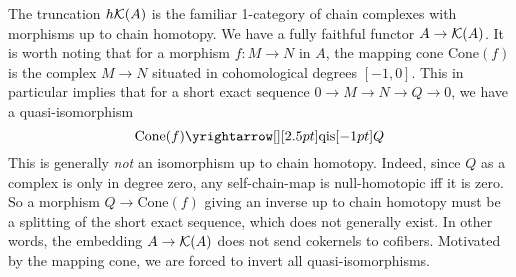 \documentclass{article}
\begin{document}
The truncation $h\mathcal{K}(A)$ is the familiar
1-category of chain complexes with morphisms up to chain homotopy.
We have a fully faithful functor $A \to \mathcal{K}(A)$.
It is worth noting that for a morphism $f : M \to N$ in $A$,
the mapping cone $\mathrm{Cone}(f)$ is the complex $M \to N$
situated in cohomological degrees $[-1, 0]$.
This in particular implies that for a short exact sequence
$0 \to M \to N \to Q \to 0$,
we have a quasi-isomorphism \[
  \mathrm{Cone}(f) \map{\text{qis}}{} Q
\] 
This is generally \emph{not} an isomorphism up to chain homotopy.
Indeed, since $Q$ as a complex is only in degree zero,
any self-chain-map is null-homotopic iff it is zero.
So a morphism $Q \to \mathrm{Cone}(f)$ giving an inverse
up to chain homotopy must be a splitting of the short exact sequence,
which does not generally exist.
In other words,
the embedding $A \to \mathcal{K}(A)$ does not send cokernels to cofibers.
Motivated by the mapping cone, we are forced to invert all quasi-isomorphisms.
  
\end{document}
